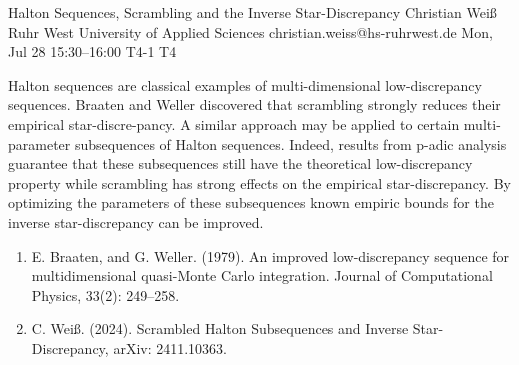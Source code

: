 \documentclass[12pt,lettersize,oneside]{book} %
\begin{document}
\begin{talk}
  {Halton Sequences, Scrambling and the Inverse Star-Discrepancy}%
  {Christian Wei\ss{}}%
  {Ruhr West University of Applied Sciences}%
  {christian.weiss@hs-ruhrwest.de}%
  {}%
  {}%
  {Mon, Jul 28 15:30--16:00}%
  {T4-1}%
  {T4}%
  {}%
  
    
   
Halton sequences are classical examples of multi-dimensional low-discrepancy sequences. Braaten and Weller discovered that scrambling strongly reduces their empirical star-discre-pancy. A similar approach may be applied to certain multi-parameter subsequences of Halton sequences. Indeed, results from p-adic analysis guarantee that these subsequences still have the theoretical low-discrepancy property while scrambling has strong effects on the empirical star-discrepancy. By optimizing the parameters of these subsequences known empiric bounds for the inverse star-discrepancy can be improved.

\medskip


\begin{enumerate}
 \item[{[1]}] E. Braaten, and G. Weller. (1979). An improved low-discrepancy sequence for multidimensional quasi-Monte Carlo integration. Journal of Computational Physics, 33(2): 249--258.
 \item[{[2]}] C. Wei\ss{}. (2024). Scrambled Halton Subsequences and Inverse Star-Discrepancy, arXiv: 2411.10363. 
\end{enumerate}

\end{talk}
\end{document}
